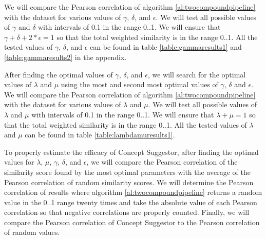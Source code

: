 \documentclass{article}
\begin{document}
We will compare the Pearson correlation of algorithm \ref{al:twocompoundpipeline} with the dataset for various values of $\gamma$, $\delta$, and $\epsilon$. We will test all possible values of $\gamma$ and $\delta$ with intervals of 0.1 in the range 0..1. We will ensure that $\gamma + \delta + 2 * \epsilon = 1$ so that the total weighted similarity is in the range 0..1. All the tested values of $\gamma$, $\delta$, and $\epsilon$ can be found in table \ref{table:gammaresults1} and \ref{table:gammaresults2} in the appendix. 

After finding the optimal values of $\gamma$, $\delta$, and $\epsilon$, we will search for the optimal values of $\lambda$ and $\mu$ using the most and second most optimal values of $\gamma$, $\delta$ and $\epsilon$. We will compare the Pearson correlation of algorithm \ref{al:twocompoundpipeline} with the dataset for various values of $\lambda$ and $\mu$. We will test all possible values of $\lambda$ and $\mu$ with intervals of 0.1 in the range 0..1. We will ensure that $\lambda + \mu = 1$ so that the total weighted similarity is in the range 0..1. All the tested values of $\lambda$ and $\mu$ can be found in table \ref{table:lambdamuresults1}.

To properly estimate the efficacy of Concept Suggestor, after finding the optimal values for $\lambda$, $\mu$, $\gamma$, $\delta$, and $\epsilon$, we will compare the Pearson correlation of the similarity score found by the most optimal parameters with the average of the Pearson correlation of random similarity scores. We will determine the Pearson correlation of results where algorithm \ref{al:twocompoundpipeline} returns a random value in the 0..1 range twenty times and take the absolute value of each Pearson correlation so that negative correlations are properly counted. Finally, we will compare the Pearson correlation of Concept Suggestor to the Pearson correlation of random values.



\end{document}
